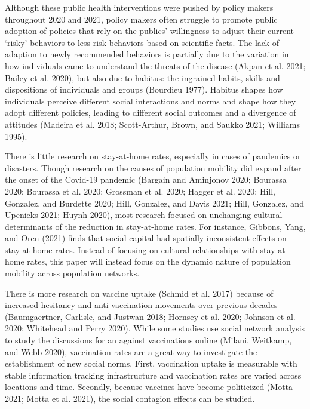 Although these public health interventions were pushed by policy makers
throughout 2020 and 2021, policy makers often struggle to promote public
adoption of policies that rely on the publics' willingness to adjust their
current `risky' behaviors to less-risk behaviors based on scientific facts. The
lack of adaption to newly recommended behaviors is partially due to the
variation in how individuals came to understand the threats of the disease
(Akpan et al. 2021; Bailey et al. 2020), but also due to habitus: the
ingrained habits, skills and dispositions of individuals and groups
(Bourdieu 1977). Habitus shapes how individuals perceive different social
interactions and norms and shape how they adopt different policies, leading to
different social outcomes and a divergence of attitudes (Madeira et al. 2018; Scott-Arthur, Brown, and Saukko 2021; Williams 1995).

There is little research on stay-at-home rates, especially in cases of pandemics
or disasters. Though research on the causes of population mobility did expand
after the onset of the Covid-19 pandemic (Bargain and Aminjonov 2020; Bourassa 2020; Bourassa et al. 2020; Grossman et al. 2020; Hagger et al. 2020; Hill, Gonzalez, and Burdette 2020; Hill, Gonzalez, and Davis 2021; Hill, Gonzalez, and Upenieks 2021; Huynh 2020), most research focused on unchanging cultural
determinants of the reduction in stay-at-home rates. For instance,
Gibbons, Yang, and Oren (2021) finds that social capital had spatially inconsistent effects on
stay-at-home rates. Instead of focusing on cultural relationships with
stay-at-home rates, this paper will instead focus on the dynamic nature of
population mobility across population networks.

There is more research on vaccine uptake
(Schmid et al. 2017) because of increased hesitancy and
anti-vaccination movements over previous decades
(Baumgaertner, Carlisle, and Justwan 2018; Hornsey et al. 2020; Johnson et al. 2020; Whitehead and Perry 2020). While some studies use social network analysis to
study the discussions for an against vaccinations online
(Milani, Weitkamp, and Webb 2020), vaccination rates are a great way to
investigate the establishment of new social norms. First, vaccination uptake is
measurable with stable information tracking infrastructure and vaccination
rates are varied across locations and time. Secondly, because vaccines have
become politicized (Motta 2021; Motta et al. 2021), the social contagion effects can be
studied.

